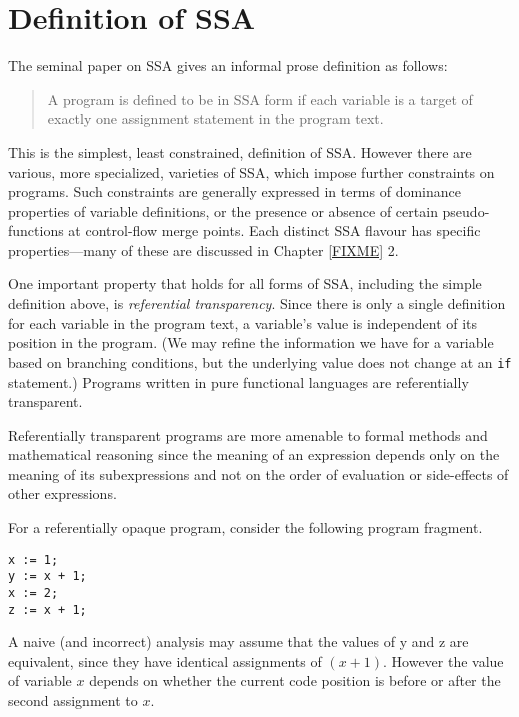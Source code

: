
\section{Definition of SSA}


The seminal paper on SSA 
\cite{cytron91efficiently}
gives an informal prose
definition as follows:

\begin{quotation}
A program is defined to be in SSA
form if each variable is a target of
exactly one assignment statement in the
program text.
\end{quotation}



This is the simplest,
least constrained, definition of SSA. However
there are various, more specialized, varieties of SSA,
which impose further constraints on programs.
Such constraints are generally expressed in terms
of dominance properties of variable definitions, or
the presence or absence of certain 
pseudo-functions at control-flow merge points.
Each distinct SSA flavour has specific properties---many of
these are discussed in Chapter \ref{FIXME} 2.

One important property that holds for all forms of SSA,
including the simple definition above, is 
\emph{referential transparency}.
Since there is only a single definition for each variable
in the program text, a variable's value
is independent of
its position in the program.
(We may refine the information we have for a variable
based on branching conditions, but the underlying value
does not change at an \texttt{if} statement.)
Programs written in pure functional languages
are referentially transparent.

Referentially transparent programs are more amenable to 
formal methods and mathematical reasoning since
the meaning of an expression depends only on the
meaning of its subexpressions
and not on the order of evaluation or
side-effects of other expressions.

For a referentially opaque program, consider
the following program fragment.
\begin{verbatim}
x := 1;
y := x + 1;
x := 2;
z := x + 1;
\end{verbatim}
A naive (and incorrect) analysis may assume that the values
of y and z are equivalent, since they have identical 
assignments of $(x+1)$. 
However the value of variable $x$ depends on whether
the current code position is before or after the second assignment
to $x$. 

